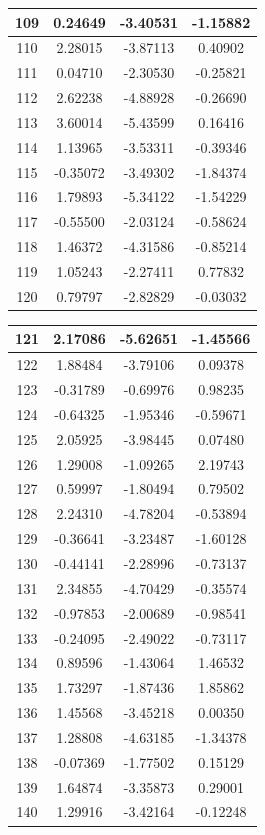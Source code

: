 \documentclass[14pt,a4paper]{scrartcl}
\begin{document}
\begin{table}[ht]
\begin{tabular}{|c||c||c||c|}
	\hline
	109 & 0.24649 & -3.40531 & -1.15882 \\ 
	\hline
	110 & 2.28015 & -3.87113 & 0.40902 \\ 
	\hline
	111 & 0.04710 & -2.30530 & -0.25821 \\ 
	\hline
	112 & 2.62238 & -4.88928 & -0.26690 \\ 
	\hline
	113 & 3.60014 & -5.43599 & 0.16416 \\ 
	\hline
	114 & 1.13965 & -3.53311 & -0.39346 \\ 
	\hline
	115 & -0.35072 & -3.49302 & -1.84374 \\ 
	\hline
	116 & 1.79893 & -5.34122 & -1.54229 \\ 
	\hline
	117 & -0.55500 & -2.03124 & -0.58624 \\ 
	\hline
	118 & 1.46372 & -4.31586 & -0.85214 \\ 
	\hline
	119 & 1.05243 & -2.27411 & 0.77832 \\ 
	\hline
	120 & 0.79797 & -2.82829 & -0.03032 \\ 		
	\end{tabular}
\end{table}
	
\begin{table}[ht]
	\centering
	\begin{tabular}{|c||c||c||c|}
	\hline
	121 & 2.17086 & -5.62651 & -1.45566 \\ 
	\hline
	122 & 1.88484 & -3.79106 & 0.09378 \\ 
	\hline
	123 & -0.31789 & -0.69976 & 0.98235 \\ 
	\hline
	124 & -0.64325 & -1.95346 & -0.59671 \\ 
	\hline
	125 & 2.05925 & -3.98445 & 0.07480 \\ 
	\hline
	126 & 1.29008 & -1.09265 & 2.19743 \\ 
	\hline
	127 & 0.59997 & -1.80494 & 0.79502 \\ 
	\hline
	128 & 2.24310 & -4.78204 & -0.53894 \\ 
	\hline
	129 & -0.36641 & -3.23487 & -1.60128 \\ 
	\hline
	130 & -0.44141 & -2.28996 & -0.73137 \\ 
	\hline
	131 & 2.34855 & -4.70429 & -0.35574 \\ 
	\hline
	132 & -0.97853 & -2.00689 & -0.98541 \\ 
	\hline
	133 & -0.24095 & -2.49022 & -0.73117 \\ 
	\hline
	134 & 0.89596 & -1.43064 & 1.46532 \\ 
	\hline
	135 & 1.73297 & -1.87436 & 1.85862 \\ 
	\hline
	136 & 1.45568 & -3.45218 & 0.00350 \\ 
	\hline
	137 & 1.28808 & -4.63185 & -1.34378 \\ 
	\hline
	138 & -0.07369 & -1.77502 & 0.15129 \\ 
	\hline
	139 & 1.64874 & -3.35873 & 0.29001 \\ 
	\hline
	140 & 1.29916 & -3.42164 & -0.12248 \\ 
	\hline		
	\end{tabular}
\end{table}
\end{document}
